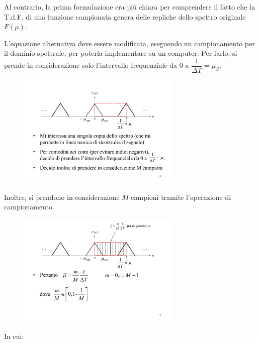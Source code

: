 \documentclass[a4paper]{article}
\begin{document}
	\noindent
	Al contrario, la prima formulazione era più chiara per comprendere il fatto che la T.d.F. di una funzione campionata genera delle repliche dello spettro originale $F\left(\mu\right)$.\newline
	
	\noindent
	L'equazione alternativa deve essere modificata, eseguendo un campionamento per il dominio spettrale, per poterla implementare su un computer. Per farlo, si prende in considerazione solo l'intervallo frequenziale da $0$ a $\dfrac{1}{\Delta T} = \mu_{S}$.
	
	\begin{figure}[!htp]
		\centering
		\includegraphics[width=0.7\textwidth]{img/trasformata_fourier_discreta1.pdf}
	\end{figure}

	\noindent
	Inoltre, si prendono in considerazione $M$ campioni tramite l'operazione di campionamento.
	
	\begin{figure}[!htp]
		\centering
		\includegraphics[width=0.7\textwidth]{img/trasformata_fourier_discreta2.pdf}
	\end{figure}

	\newpage

	\noindent
	In cui:
	
\end{document}
